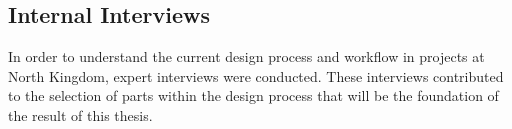 \subsection{Internal Interviews}
In order to understand the current design process and workflow in projects at North Kingdom, expert interviews were conducted. These interviews contributed to the selection of parts within the design process that will be the foundation of the result of this thesis.
